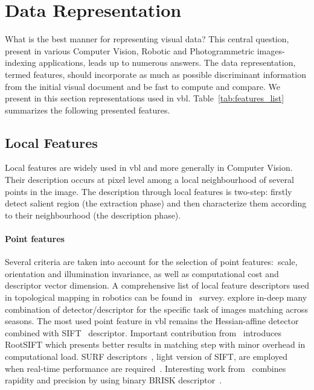 \section{Data Representation}
\label{sec:image_representation}
	


		What is the best manner for representing visual data? This central question, present in various Computer Vision, Robotic and Photogrammetric images-indexing applications, leads up to numerous answers. The data representation, termed features, should incorporate as much as possible discriminant information from the initial visual document and be fast to compute and compare. We present in this section representations used in \ac{vbl}. Table~\ref{tab:features_list} summarizes the following presented features.
		
	\subsection{Local Features}
	\label{subsec:local_feature}
		Local features are widely used in \ac{vbl} and more generally in Computer Vision. Their description occurs at pixel level among a local neighbourhood of several points in the image. The description through local features is two-step: firstly detect salient region (the extraction phase) and then characterize them according to their neighbourhood (the description phase).		
				
		\paragraph{Point features} Several criteria are taken into account for the selection of point features:~scale, orientation and illumination invariance, as well as computational cost and descriptor vector dimension. A comprehensive list of local feature descriptors used in topological mapping in robotics can be found in~\citet{Garcia-Fidalgo2015} survey. \citet{Krajnik2017a} explore in-deep many combination of detector/descriptor for the specific task of images matching across seasons. The most used point feature in \ac{vbl} remains the Hessian-affine detector~\citep{Mikolajczyk2004} combined with SIFT~\citep{Lowe2004} descriptor. Important contribution from~\citet{Arandjelovic2012} introduces RootSIFT which presents better results in matching step with minor overhead in computational load. SURF descriptors~\citep{Bay2006}, light version of SIFT, are employed when real-time performance are required~\citep{Cummins2008,Qu2016,Stumm2016}. Interesting work from~\citet{Feng2016a} combines rapidity and precision by using binary BRISK descriptor~\citep{Leutenegger2011brisk}.
        

